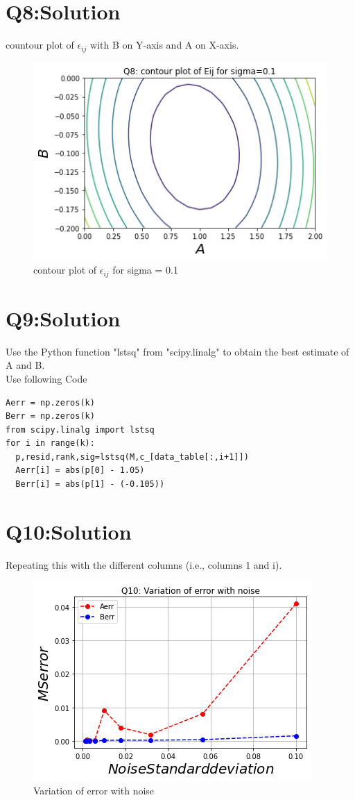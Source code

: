 \documentclass[11pt, a4paper]{article}
\begin{document}
\section*{Q8:Solution}
countour plot of $\epsilon_{ij}$ with B on Y-axis and A on X-axis.
\begin{figure}[!tbh]
  \centering
  \includegraphics[scale=0.5]{Q8plot.png}  
  \caption{contour plot of $\epsilon_{ij}$ for sigma = 0.1}
\end{figure}

\section*{Q9:Solution}
Use the Python function "lstsq" from "scipy.linalg" to obtain the best estimate of A and B.\\
Use following Code
\begin{verbatim}
Aerr = np.zeros(k)
Berr = np.zeros(k)
from scipy.linalg import lstsq
for i in range(k):
  p,resid,rank,sig=lstsq(M,c_[data_table[:,i+1]])
  Aerr[i] = abs(p[0] - 1.05)
  Berr[i] = abs(p[1] - (-0.105))
\end{verbatim}

\section*{Q10:Solution}
Repeating this with the different columns (i.e., columns 1 and i).
\begin{figure}[!tbh]
  \centering
  \includegraphics[scale=0.5]{Q10plot.png}  
  \caption{Variation of error with noise}
\end{figure}
\end{document}
